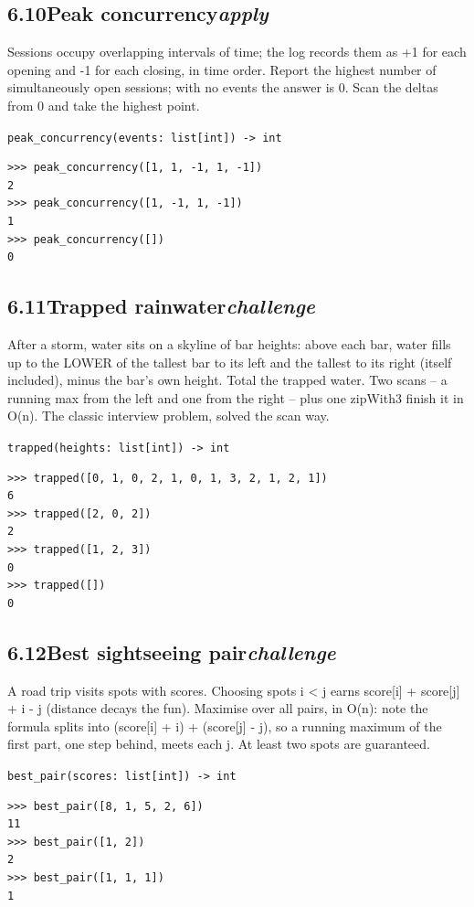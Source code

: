 \documentclass[10pt,letterpaper]{book}
\begin{document}
\subsection*{6.10\quad Peak concurrency\hfill\textnormal{\textit{apply}}}
Sessions occupy overlapping intervals of time; the log records them as +1 for each opening and -1 for each closing, in time order. Report the highest number of simultaneously open sessions; with no events the answer is 0. Scan the deltas from 0 and take the highest point.

\noindent\texttt{peak\_concurrency(events: list[int]) -> int}
\begin{lstlisting}[style=ex]
>>> peak_concurrency([1, 1, -1, 1, -1])
2
>>> peak_concurrency([1, -1, 1, -1])
1
>>> peak_concurrency([])
0
\end{lstlisting}
\subsection*{6.11\quad Trapped rainwater\hfill\textnormal{\textit{challenge}}}
After a storm, water sits on a skyline of bar heights: above each bar, water fills up to the LOWER of the tallest bar to its left and the tallest to its right (itself included), minus the bar's own height. Total the trapped water. Two scans -- a running max from the left and one from the right -- plus one zipWith3 finish it in O(n). The classic interview problem, solved the scan way.

\noindent\texttt{trapped(heights: list[int]) -> int}
\begin{lstlisting}[style=ex]
>>> trapped([0, 1, 0, 2, 1, 0, 1, 3, 2, 1, 2, 1])
6
>>> trapped([2, 0, 2])
2
>>> trapped([1, 2, 3])
0
>>> trapped([])
0
\end{lstlisting}
\subsection*{6.12\quad Best sightseeing pair\hfill\textnormal{\textit{challenge}}}
A road trip visits spots with scores. Choosing spots i < j earns score[i] + score[j] + i - j (distance decays the fun). Maximise over all pairs, in O(n): note the formula splits into (score[i] + i) + (score[j] - j), so a running maximum of the first part, one step behind, meets each j. At least two spots are guaranteed.

\noindent\texttt{best\_pair(scores: list[int]) -> int}
\begin{lstlisting}[style=ex]
>>> best_pair([8, 1, 5, 2, 6])
11
>>> best_pair([1, 2])
2
>>> best_pair([1, 1, 1])
1
\end{lstlisting}
\clearpage
\end{document}
